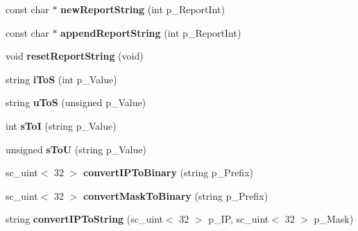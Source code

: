 \begin{DoxyCompactItemize}
\item 
\hypertarget{classStringTools_aec710716ef3d9cff807fd70c7d848d33}{const char $\ast$ {\bfseries new\-Report\-String} (int p\-\_\-\-Report\-Int)}\label{classStringTools_aec710716ef3d9cff807fd70c7d848d33}

\item 
\hypertarget{classStringTools_ad4fdc3dc36b9b7f25f794330ffee2047}{const char $\ast$ {\bfseries append\-Report\-String} (int p\-\_\-\-Report\-Int)}\label{classStringTools_ad4fdc3dc36b9b7f25f794330ffee2047}

\item 
\hypertarget{classStringTools_ae0b98503fca8fdb3d5a3eac77f203839}{void {\bfseries reset\-Report\-String} (void)}\label{classStringTools_ae0b98503fca8fdb3d5a3eac77f203839}

\item 
\hypertarget{classStringTools_a142900b271efdee814d71239de643eba}{string {\bfseries i\-To\-S} (int p\-\_\-\-Value)}\label{classStringTools_a142900b271efdee814d71239de643eba}

\item 
\hypertarget{classStringTools_ac2126c3eec7acef09f8fd46291b2413e}{string {\bfseries u\-To\-S} (unsigned p\-\_\-\-Value)}\label{classStringTools_ac2126c3eec7acef09f8fd46291b2413e}

\item 
\hypertarget{classStringTools_a50b5f1a75109971e60d6543ee76816fc}{int {\bfseries s\-To\-I} (string p\-\_\-\-Value)}\label{classStringTools_a50b5f1a75109971e60d6543ee76816fc}

\item 
\hypertarget{classStringTools_a5627021cfdc5e0586aa31d4cce7fab17}{unsigned {\bfseries s\-To\-U} (string p\-\_\-\-Value)}\label{classStringTools_a5627021cfdc5e0586aa31d4cce7fab17}

\item 
\hypertarget{classStringTools_a23c0ef7bac00175a378a75ca7a07bb41}{sc\-\_\-uint$<$ 32 $>$ {\bfseries convert\-I\-P\-To\-Binary} (string p\-\_\-\-Prefix)}\label{classStringTools_a23c0ef7bac00175a378a75ca7a07bb41}

\item 
\hypertarget{classStringTools_a9395eb0395c837334067f4d24527b5a1}{sc\-\_\-uint$<$ 32 $>$ {\bfseries convert\-Mask\-To\-Binary} (string p\-\_\-\-Prefix)}\label{classStringTools_a9395eb0395c837334067f4d24527b5a1}

\item 
\hypertarget{classStringTools_ac9bdf54d89ba0512e692e4a8c7567bb4}{string {\bfseries convert\-I\-P\-To\-String} (sc\-\_\-uint$<$ 32 $>$ p\-\_\-\-I\-P, sc\-\_\-uint$<$ 32 $>$ p\-\_\-\-Mask)}\label{classStringTools_ac9bdf54d89ba0512e692e4a8c7567bb4}


\end{DoxyCompactItemize}
